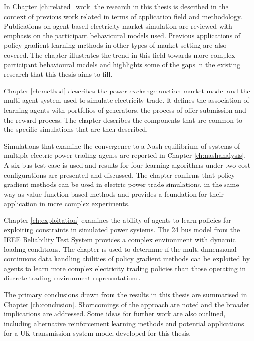 In Chapter \ref{ch:related_work} the research in this thesis is described in the
context of previous work related in terms of application field and methodology.
Publications on agent based electricity market simulation are reviewed with
emphasis on the participant behavioural models used. Previous applications of
policy gradient learning methods in other types of market setting are also
covered.  The chapter illustrates the trend in this field towards more complex
participant behavioural models and highlights some of the gaps in the existing
research that this thesis aims to fill.

Chapter \ref{ch:method} describes the power exchange auction market model and
the multi-agent system used to simulate electricity trade.  It defines the
association of learning agents with portfolios of generators, the process of
offer submission and the reward process. The chapter describes the components
that are common to the specific simulations that are then described.

Simulations that examine the convergence to a Nash equilibrium of systems of
multiple electric power trading agents are reported in Chapter
\ref{ch:nashanalysis}. A six bus test case is used and results for four learning
algorithms under two cost configurations are presented and discussed. The
chapter confirms that policy gradient methods can be used in electric power
trade simulations, in the same way as value function based methods and provides
a foundation for their application in more complex experiments.

Chapter \ref{ch:exploitation} examines the ability of agents to learn policies
for exploiting constraints in simulated power systems.  The 24 bus model from
the IEEE Reliability Test System provides a complex environment with dynamic
loading conditions. The chapter is used to determine if the multi-dimensional
continuous data handling abilities of policy gradient methods can be exploited
by agents to learn more complex electricity trading policies than those
operating in discrete trading environment representations.

The primary conclusions drawn from the results in this thesis are summarised in
Chapter \ref{ch:conclusion}.  Shortcomings of the approach are noted and the
broader implications are addressed.  Some ideas for further work are also
outlined, including alternative reinforcement learning methods and potential
applications for a UK transmission system model developed for this thesis.

